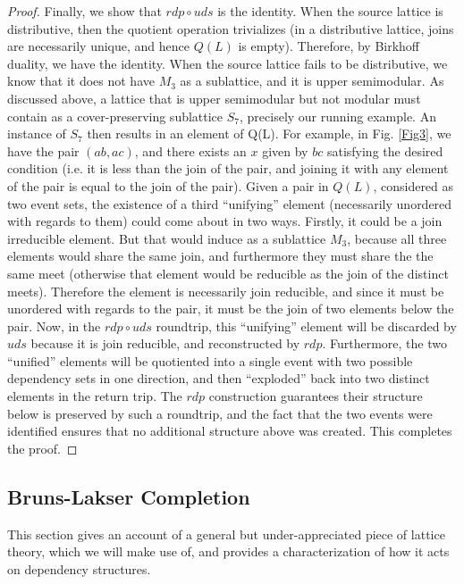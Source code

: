 \documentclass[a4paper,USenglish,cleveref, autoref, thm-restate,authorcolumns]{lipics-v2019}
\begin{document}
\begin{proof}
Finally, we show that \(rdp \circ uds\) is the identity. When the source lattice is distributive, then the quotient operation trivializes (in a distributive lattice, joins are necessarily unique, and hence \(Q(L)\) is empty). Therefore, by Birkhoff duality, we have the identity. When the source lattice fails to be distributive, we know that it does not have \(M_3\) as a sublattice, and it is upper semimodular. As discussed above, a lattice that is upper semimodular but not modular must contain as a cover-preserving sublattice \(S_7\), precisely our running example. An instance of \(S_7\) then results in an element of Q(L). For example, in Fig. \ref{Fig3},  we have the pair \((ab,ac)\), and there exists an \(x\) given by \(bc\) satisfying the desired condition (i.e. it is less than the join of the pair, and joining it with any element of the pair is equal to the join of the pair). Given a pair in \(Q(L)\), considered as two event sets, the existence of a third ``unifying'' element (necessarily unordered with regards to them) could come about in two ways. Firstly, it could be a join irreducible element. But that would induce as a sublattice \(M_3\), because all three elements would share the same join, and furthermore they must share the the same meet (otherwise that element would be reducible as the join of the distinct meets). Therefore the element is necessarily join reducible, and since it must be unordered with regards to the pair, it must be the join of two elements below the pair. Now, in the \(rdp \circ uds\) roundtrip, this ``unifying'' element will be discarded by \(uds\) because it is join reducible, and reconstructed by \(rdp\). Furthermore, the two ``unified'' elements will be quotiented into a single event with two possible dependency sets in one direction, and then ``exploded'' back into two distinct elements in the return trip. The \(rdp\) construction guarantees their structure below is preserved by such a roundtrip, and the fact that the two events were identified ensures that no additional structure above was created. This completes the proof.
\end{proof}

\subsection{Bruns-Lakser Completion}

This section gives an account of a general but under-appreciated piece of lattice theory, which we will make use of, and provides a characterization of how it acts on dependency structures.
\end{document}
